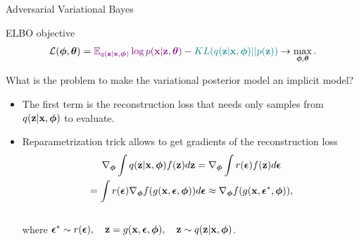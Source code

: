 \begin{frame}{Adversarial Variational Bayes}
	\begin{block}{ELBO objective}
		\vspace{-0.6cm}
		\[
			 \mathcal{L} (\boldsymbol{\phi}, \boldsymbol{\theta})  = {\color{violet}\mathbb{E}_{q(\mathbf{z} | \mathbf{x}, \boldsymbol{\phi})} \log p(\mathbf{x} | \mathbf{z}, \boldsymbol{\theta})} - {\color{teal}KL(q(\mathbf{z}| \mathbf{x}, \boldsymbol{\phi}) || p(\mathbf{z}))} \rightarrow \max_{\boldsymbol{\phi}, \boldsymbol{\theta}}.
		\]	
		\vspace{-0.6cm}
	\end{block}
	What is the problem to make the variational posterior model an implicit model?
	\begin{itemize}
	\item {\color{violet}The first term} is the reconstruction loss that needs only samples from $q(\mathbf{z} | \mathbf{x}, \boldsymbol{\phi})$ to evaluate.
	\item Reparametrization trick allows to get gradients of the reconstruction loss
		\vspace{-0.4cm}
		\begin{multline*}
			\nabla_{\boldsymbol{\phi}}\int q(\mathbf{z}|\mathbf{x}, \boldsymbol{\phi}) f(\mathbf{z}) d\mathbf{z} = \nabla_{\boldsymbol{\phi}}\int r(\boldsymbol{\epsilon})  f(\mathbf{z}) d\boldsymbol{\epsilon} \\ = \int r(\boldsymbol{\epsilon}) \nabla_{\boldsymbol{\phi}} f(g(\mathbf{x}, \boldsymbol{\epsilon}, \boldsymbol{\phi})) d\boldsymbol{\epsilon} \approx \nabla_{\boldsymbol{\phi}} f(g(\mathbf{x}, \boldsymbol{\epsilon}^*, \boldsymbol{\phi})),
		\end{multline*}
		\vspace{-0.6cm} \\
		where $\boldsymbol{\epsilon}^* \sim r(\boldsymbol{\epsilon}), \quad \mathbf{z} = g(\mathbf{x}, \boldsymbol{\epsilon}, \boldsymbol{\phi}), \quad \mathbf{z} \sim q(\mathbf{z} | \mathbf{x}, \boldsymbol{\phi})$.
	\end{itemize}
\end{frame}

